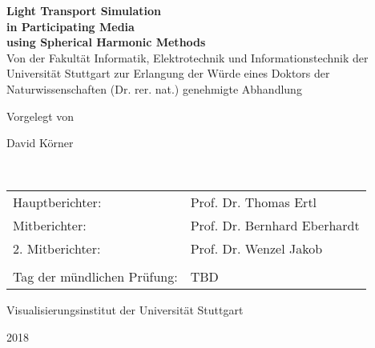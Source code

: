 \begin{titlepage}
 
\begin{center}
	\textbf{\huge Light Transport Simulation}\\ 
	\vspace{0.3cm}
	\textbf{\huge in Participating Media}\\ 
	\vspace{0.3cm}
	\textbf{\huge using Spherical Harmonic Methods}\\
	
	\vspace{1.5cm}	
	\large Von der Fakultät Informatik, Elektrotechnik und Informationstechnik der Universität Stuttgart zur Erlangung der Würde eines Doktors der Naturwissenschaften (Dr. rer. nat.) genehmigte Abhandlung
	
	\vspace{1.8cm}
	Vorgelegt von
	
	\vspace{0.2cm}
	\huge David Körner
	
	\vspace{0.2cm}
	\large \
	
	\vspace{1.8cm}	
	\begin{longtable}{l l}
	Hauptberichter: & Prof. Dr. Thomas Ertl \\
	Mitberichter: & Prof. Dr. Bernhard Eberhardt \\
	2. Mitberichter: & Prof. Dr. Wenzel Jakob\\
	& 	\\
	Tag der mündlichen Prüfung: & TBD
	\end{longtable}
		
	\vspace{1.5cm}
	Visualisierungsinstitut der Universität Stuttgart
	
	2018
\end{center}
\vspace{1cm}
\begin{flushright}
\end{flushright}
\end{titlepage}


